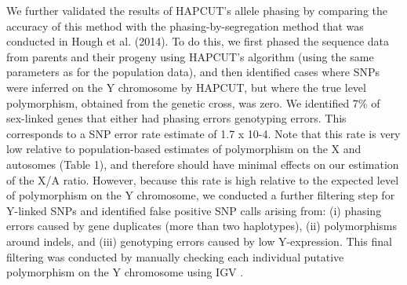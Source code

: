 \documentclass[9pt,twocolumn,twoside]{gsajnl}
\begin{document}
We further validated the results of HAPCUT’s allele phasing by comparing the accuracy of this method with the phasing-by-segregation method that was conducted in Hough et al. (2014). To do this, we first phased the sequence data from parents and their progeny using HAPCUT’s algorithm (using the same parameters as for the population data), and then identified cases where SNPs were inferred on the Y chromosome by HAPCUT, but where the true level polymorphism, obtained from the genetic cross, was zero. We identified 7\% of sex-linked genes that either had phasing errors genotyping errors. This corresponds to a SNP error rate estimate of 1.7 x 10-4. Note that this rate is very low relative to population-based estimates of polymorphism on the X and autosomes (Table 1), and therefore should have minimal effects on our estimation of the X/A ratio. However, because this rate is high relative to the expected level of polymorphism on the Y chromosome, we conducted a further filtering step for Y-linked SNPs and identified false positive SNP calls arising from: (i) phasing errors caused by gene duplicates (more than two haplotypes), (ii) polymorphisms around indels, and (iii) genotyping errors caused by low Y-expression. This final filtering was conducted by manually checking each individual putative polymorphism on the Y chromosome using IGV \citep{robinson2011integrative}.
\end{document}
